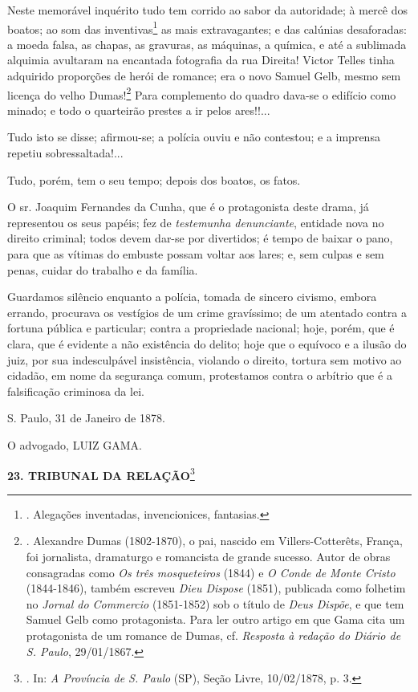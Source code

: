 Neste memorável inquérito tudo tem corrido ao sabor da autoridade; à
mercê dos boatos; ao som das inventivas\footnote{. Alegações inventadas,
  invencionices, fantasias.} as mais extravagantes; e das calúnias
desaforadas: a moeda falsa, as chapas, as gravuras, as máquinas, a
química, e até a sublimada alquimia avultaram na encantada fotografia da
rua Direita! Victor Telles tinha adquirido proporções de herói de
romance; era o novo Samuel Gelb, mesmo sem licença do velho
Dumas!\footnote{. Alexandre Dumas (1802-1870), o pai, nascido em
  Villers-Cotterêts, França, foi jornalista, dramaturgo e romancista de
  grande sucesso. Autor de obras consagradas como \emph{Os três
  mosqueteiros} (1844) e \emph{O Conde de Monte Cristo} (1844-1846),
  também escreveu \emph{Dieu Dispose} (1851), publicada como folhetim no
  \emph{Jornal do Commercio} (1851-1852) sob o título de \emph{Deus
  Dispõe}, e que tem Samuel Gelb como protagonista. Para ler outro
  artigo em que Gama cita um protagonista de um romance de Dumas, cf.
  \emph{Resposta à redação do Diário de S. Paulo}, 29/01/1867.} Para
complemento do quadro dava-se o edifício como minado; e todo o
quarteirão prestes a ir pelos ares!!...

Tudo isto se disse; afirmou-se; a polícia ouviu e não contestou; e a
imprensa repetiu sobressaltada!...

Tudo, porém, tem o seu tempo; depois dos boatos, os fatos.

O sr. Joaquim Fernandes da Cunha, que é o protagonista deste drama, já
representou os seus papéis; fez de \emph{testemunha denunciante},
entidade nova no direito criminal; todos devem dar-se por divertidos; é
tempo de baixar o pano, para que as vítimas do embuste possam voltar aos
lares; e, sem culpas e sem penas, cuidar do trabalho e da família.

Guardamos silêncio enquanto a polícia, tomada de sincero civismo, embora
errando, procurava os vestígios de um crime gravíssimo; de um atentado
contra a fortuna pública e particular; contra a propriedade nacional;
hoje, porém, que é clara, que é evidente a não existência do delito;
hoje que o equívoco e a ilusão do juiz, por sua indesculpável
insistência, violando o direito, tortura sem motivo ao cidadão, em nome
da segurança comum, protestamos contra o arbítrio que é a falsificação
criminosa da lei.

S. Paulo, 31 de Janeiro de 1878.

O advogado, LUIZ GAMA.

\textbf{23. TRIBUNAL DA RELAÇÃO}\footnote{. In: \emph{A Província de S.
  Paulo} (SP), Seção Livre, 10/02/1878, p. 3.}

